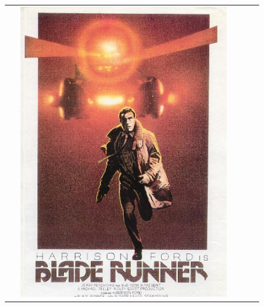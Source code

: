 \newpage
\begin{tabular}{c c c}
\begin{minipage}{5cm}
\includegraphics[width=0.9\textwidth]{affiches/bladerunner.jpg}  
\end{minipage} &
\begin{minipage}{5cm}

\end{minipage}
\end{tabular}
